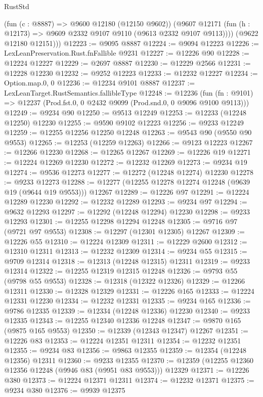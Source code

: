 \begin{lexlean}{RustStd}
\begin{coremodule}
          (fun (c : @8887) => @9600 @12180 (@12150 @9602))
          (@9607 @12171 (fun (h : @12173) => @9609 @2332 @9107 @9110 (@9613 @2332 @9107 @9113))))
        (@9622 @12180 @12151)))
@12223 := @9095 @8887
@12224 := @9094 @12223
@12226 := LexLeanPreservation.Rust.fnFallible @9231
@12227 := @12226 @90
@12228 := @12224 @12227
@12229 := @2697 @8887
@12230 := @12229 @2566
@12231 := @12228 @12230
@12232 := @9252 @12223
@12233 := @12232 @12227
@12234 := Option.map.{0, 0}
@12236 := @12234 @9101 @8887
@12237 := LexLeanTarget.RustSemantics.fallibleType
@12248 := @12236
    (fun (fn : @9101) => @12237 (Prod.fst.{0, 0} @2432 @9099 (Prod.snd.{0, 0} @9096 @9100 @9113)))
@12249 := @9234 @90
@12250 := @9513 @12249
@12253 := @12233 (@12248 @12250) @12230
@12255 := @9590 @9102 @12223
@12256 := @9233 @12249
@12259 := @12255 @12256 @12250 @12248
@12263 := @9543 @90 (@9550 @90 @9553)
@12265 := @12253 (@12259 @12263)
@12266 := @9123 @12223
@12267 := @12266 @12230
@12268 := @12265 @12267
@12269 := @12226 @19
@12271 := @12224 @12269 @12230
@12272 := @12232 @12269
@12273 := @9234 @19
@12274 := @9536 @12273
@12277 := @12272 (@12248 @12274) @12230
@12278 := @9233 @12273
@12288 := @12277 (@12255 @12278 @12274 @12248 (@9639 @19 (@9644 @19 @9553))) @12267
@12289 := @12226 @97
@12291 := @12224 @12289 @12230
@12292 := @12232 @12289
@12293 := @9234 @97
@12294 := @9632 @12293
@12297 := @12292 (@12248 @12294) @12230
@12298 := @9233 @12293
@12301 := @12255 @12298 @12294 @12248
@12305 := @9716 @97 (@9721 @97 @9553)
@12308 := @12297 (@12301 @12305) @12267
@12309 := @12226 @55
@12310 := @12224 @12309
@12311 := @12229 @2600
@12312 := @12310 @12311
@12313 := @12232 @12309
@12314 := @9234 @55
@12315 := @9709 @12314
@12318 := @12313 (@12248 @12315) @12311
@12319 := @9233 @12314
@12322 := @12255 @12319 @12315 @12248
@12326 := @9793 @55 (@9798 @55 @9553)
@12328 := @12318 (@12322 @12326)
@12329 := @12266 @12311
@12330 := @12328 @12329
@12331 := @12226 @165
@12333 := @12224 @12331 @12230
@12334 := @12232 @12331
@12335 := @9234 @165
@12336 := @9786 @12335
@12339 := @12334 (@12248 @12336) @12230
@12340 := @9233 @12335
@12343 := @12255 @12340 @12336 @12248
@12347 := @9870 @165 (@9875 @165 @9553)
@12350 := @12339 (@12343 @12347) @12267
@12351 := @12226 @83
@12353 := @12224 @12351 @12311
@12354 := @12232 @12351
@12355 := @9234 @83
@12356 := @9863 @12355
@12359 := @12354 (@12248 @12356) @12311
@12360 := @9233 @12355
@12370 := @12359 (@12255 @12360 @12356 @12248 (@9946 @83 (@9951 @83 @9553))) @12329
@12371 := @12226 @380
@12373 := @12224 @12371 @12311
@12374 := @12232 @12371
@12375 := @9234 @380
@12376 := @9939 @12375

\end{coremodule}
\end{lexlean}
